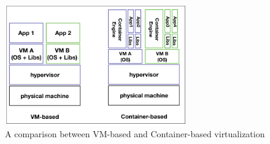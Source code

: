 


\begin{figure}
	\centering
	\includegraphics[width=0.7\textwidth]{pics/comparison.png}
	\caption{A comparison between VM-based and Container-based virtualization}
	\label{fig:comparison}
\end{figure}



